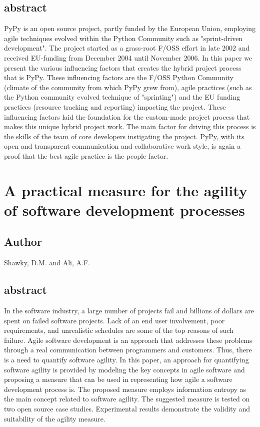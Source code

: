\documentclass[lnbip,sechang,a4paper]{svmultln}
\begin{document}
\subsection{abstract}
PyPy is an open source project, partly funded by the European Union, employing
agile techniques evolved within the Python Community such as "sprint-driven
development". The project started as a grass-root F/OSS effort in late 2002 and received EU-funding from December 2004 until November 2006. In this paper we present the various influencing factors that creates the hybrid project process that is PyPy. These influencing factors are the F/OSS Python Community (climate of the community from which PyPy grew from), agile practices (such as the Python community evolved technique of "sprinting") and the EU funding practices (resource tracking and reporting) impacting the project. These influencing factors laid the foundation for the custom-made project process that makes this unique hybrid project work. The main factor for driving this process is the skills of the team of core developers instigating the project. PyPy, with its open and transparent communication and collaborative work style, is again a proof that the best agile practice is the people factor.
\cite{1667583}
\section{A practical measure for the agility of software development processes}
\subsection{Author}
Shawky, D.M. and Ali, A.F.
\subsection{abstract}
In the software industry, a large number of projects fail and billions of
dollars are spent on failed software projects. Lack of an end user involvement,
poor requirements, and unrealistic schedules are some of the top reasons of such failure. Agile software development is an approach that addresses these problems through a real communication between programmers and customers. Thus, there is a need to quantify software agility. In this paper, an approach for quantifying software agility is provided by modeling the key concepts in agile software and proposing a measure that can be used in representing how agile a software development process is. The proposed measure employs information entropy as the main concept related to software agility. The suggested measure is tested on two open source case studies. Experimental results demonstrate the validity and suitability of the agility measure.
\cite{5645881}
\end{document}
